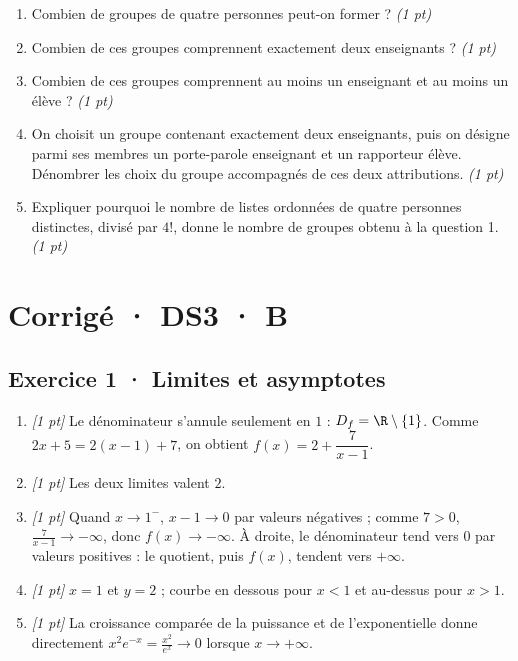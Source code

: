 \begin{enumerate}

\item Combien de groupes de quatre personnes peut-on former ? \hfill\textit{(1 pt)}

\item Combien de ces groupes comprennent exactement deux enseignants ? \hfill\textit{(1 pt)}

\item Combien de ces groupes comprennent au moins un enseignant et au moins un élève ? \hfill\textit{(1 pt)}

\item On choisit un groupe contenant exactement deux enseignants, puis on désigne parmi ses membres un porte-parole enseignant et un rapporteur élève. Dénombrer les choix du groupe accompagnés de ces deux attributions. \hfill\textit{(1 pt)}

\item Expliquer pourquoi le nombre de listes ordonnées de quatre personnes distinctes, divisé par $4!$, donne le nombre de groupes obtenu à la question 1. \hfill\textit{(1 pt)}

\end{enumerate}

\ifmxteacher\mxnewpage

\section*{Corrigé · DS3 · B}\label{cor:4-4}

\subsection*{Exercice 1 · Limites et asymptotes}\begin{enumerate}

\item \textit{[1 pt]} Le dénominateur s'annule seulement en $1$ : $D_f=\R\setminus\{1\}$. Comme $2x+5=2(x-1)+7$, on obtient $f(x)=2+\dfrac{7}{x-1}$.

\item \textit{[1 pt]} Les deux limites valent $2$.

\item \textit{[1 pt]} Quand $x\to 1^-$, $x-1\to0$ par valeurs négatives ; comme $7>0$, $\frac{7}{x-1}\to-\infty$, donc $f(x)\to-\infty$. À droite, le dénominateur tend vers $0$ par valeurs positives : le quotient, puis $f(x)$, tendent vers $+\infty$.

\item \textit{[1 pt]} $x=1$ et $y=2$ ; courbe en dessous pour $x<1$ et au-dessus pour $x>1$.

\item \textit{[1 pt]} La croissance comparée de la puissance et de l'exponentielle donne directement $x^2e^{-x}=\frac{x^2}{e^x}\to0$ lorsque $x\to+\infty$.

\end{enumerate}

